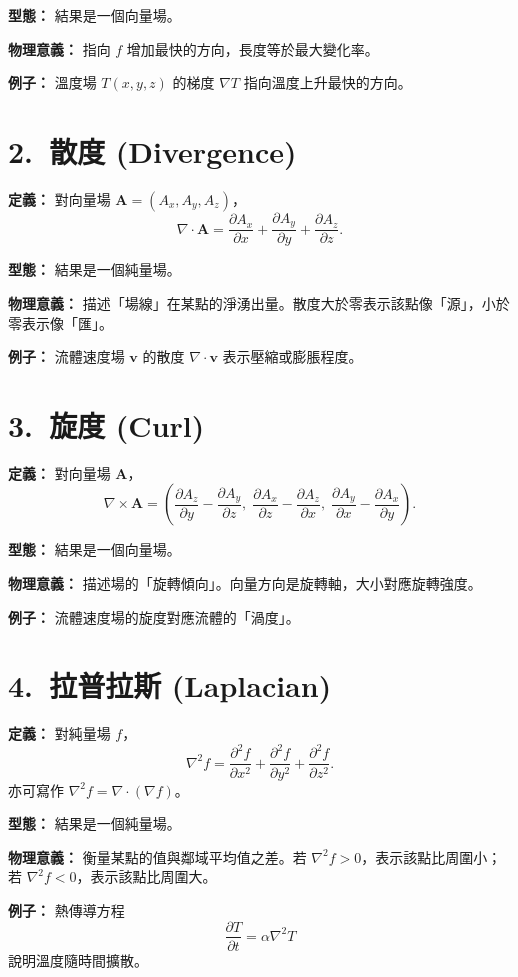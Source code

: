 \documentclass{article}
\begin{document}
\textbf{型態：} 結果是一個向量場。

\textbf{物理意義：} 指向 $f$ 增加最快的方向，長度等於最大變化率。

\textbf{例子：} 溫度場 $T(x,y,z)$ 的梯度 $\nabla T$ 指向溫度上升最快的方向。

\section*{2.~散度 (Divergence)}
\textbf{定義：} 對向量場 $\mathbf{A}=(A_x,A_y,A_z)$，
\[
\nabla \cdot \mathbf{A} =
\frac{\partial A_x}{\partial x} +
\frac{\partial A_y}{\partial y} +
\frac{\partial A_z}{\partial z}.
\]

\textbf{型態：} 結果是一個純量場。

\textbf{物理意義：} 描述「場線」在某點的淨湧出量。散度大於零表示該點像「源」，小於零表示像「匯」。

\textbf{例子：} 流體速度場 $\mathbf{v}$ 的散度 $\nabla\cdot\mathbf{v}$ 表示壓縮或膨脹程度。

\section*{3.~旋度 (Curl)}
\textbf{定義：} 對向量場 $\mathbf{A}$，
\[
\nabla \times \mathbf{A} =
\left(
\frac{\partial A_z}{\partial y}-\frac{\partial A_y}{\partial z},\;
\frac{\partial A_x}{\partial z}-\frac{\partial A_z}{\partial x},\;
\frac{\partial A_y}{\partial x}-\frac{\partial A_x}{\partial y}
\right).
\]

\textbf{型態：} 結果是一個向量場。

\textbf{物理意義：} 描述場的「旋轉傾向」。向量方向是旋轉軸，大小對應旋轉強度。

\textbf{例子：} 流體速度場的旋度對應流體的「渦度」。

\section*{4.~拉普拉斯 (Laplacian)}
\textbf{定義：} 對純量場 $f$，
\[
\nabla^2 f =
\frac{\partial^2 f}{\partial x^2}
+ \frac{\partial^2 f}{\partial y^2}
+ \frac{\partial^2 f}{\partial z^2}.
\]
亦可寫作 $\nabla^2 f = \nabla\cdot(\nabla f)$。

\textbf{型態：} 結果是一個純量場。

\textbf{物理意義：} 衡量某點的值與鄰域平均值之差。若 $\nabla^2 f > 0$，表示該點比周圍小；若 $\nabla^2 f < 0$，表示該點比周圍大。

\textbf{例子：} 熱傳導方程
\[
\frac{\partial T}{\partial t} = \alpha \nabla^2 T
\]
說明溫度隨時間擴散。
\end{document}
